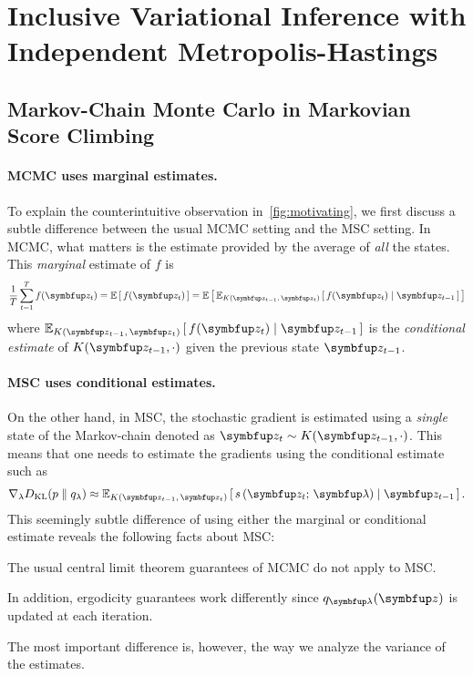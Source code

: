 
\section{Inclusive Variational Inference with Independent Metropolis-Hastings}
\subsection{Markov-Chain Monte Carlo in Markovian Score Climbing}\label{section:msc_mcmc}
\paragraph{MCMC uses marginal estimates.}
To explain the counterintuitive observation in~\cref{fig:motivating}, we first discuss a subtle difference between the usual MCMC setting and the MSC setting.
In MCMC, what matters is the estimate provided by the average of \textit{all} the states.
This \textit{marginal} estimate of \(f\) is 
\begin{align}
  \frac{1}{T} \sum^{T}_{t=1} f(\vz_t) = \E{f(\vz_t)} = \E{\Esub{K(\vz_{t-1},\,\vz_t)}{ f(\vz_t) \mid \vz_{t-1}}}
\end{align}
where \(\Esub{K(\vz_{t-1},\,\vz_{t})}{ f(\vz_t) \mid \vz_{t-1}}\) is the \textit{conditional estimate} of \(K(\vz_{t-1},\cdot)\) given the previous state \(\vz_{t-1}\).

\paragraph{MSC uses conditional estimates.}
On the other hand, in MSC, the stochastic gradient is estimated using a \textit{single} state of the Markov-chain denoted as \(\vz_t \sim K(\vz_{t-1}, \cdot)\).
This means that one needs to estimate the gradients using the conditional estimate such as
\begin{align}
  \nabla_{\lambda} \DKL{p}{q_{\lambda}} \approx \Esub{K(\vz_{t-1},\,\vz_t)}{s\,(\vz_t;\, \vlambda) \mid \vz_{t-1}}.
\end{align}
This seemingly subtle difference of using either the marginal or conditional estimate reveals the following facts about MSC:
\begin{enumerate*}[label=(\roman*)]
\item The usual central limit theorem guarantees of MCMC do not apply to MSC.
\item In addition, ergodicity guarantees work differently since \(q_{\vlambda}(\vz)\) is updated at each iteration.
\end{enumerate*}
The most important difference is, however, the way we analyze the variance of the estimates.

